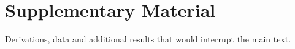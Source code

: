 \chapter{Supplementary Material}
Derivations, data and additional results that would interrupt the main text.
